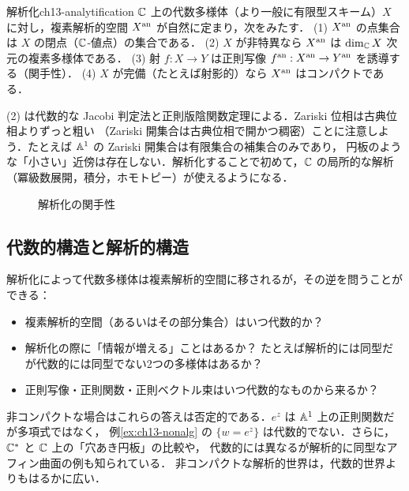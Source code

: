 \begin{myprop}{解析化}{ch13-analytification}
$\mathbb{C}$ 上の代数多様体（より一般に有限型スキーム）$X$ に対し，複素解析的空間 $X^{\rm an}$ が自然に定まり，次をみたす．
(1) $X^{\rm an}$ の点集合は $X$ の閉点（$\mathbb{C}$-値点）の集合である．
(2) $X$ が非特異なら $X^{\rm an}$ は $\dim_{\mathbb{C}} X$ 次元の複素多様体である．
(3) 射 $f:X\to Y$ は正則写像 $f^{\rm an}:X^{\rm an}\to Y^{\rm an}$ を誘導する（関手性）．
(4) $X$ が完備（たとえば射影的）なら $X^{\rm an}$ はコンパクトである．
\end{myprop}

(2) は代数的な Jacobi 判定法と正則版陰関数定理による．Zariski 位相は古典位相よりずっと粗い
（Zariski 開集合は古典位相で開かつ稠密）ことに注意しよう．たとえば $\mathbb{A}^1$ の Zariski 開集合は有限集合の補集合のみであり，
円板のような「小さい」近傍は存在しない．解析化することで初めて，$\mathbb{C}$ の局所的な解析（冪級数展開，積分，ホモトピー）が使えるようになる．

\begin{figure}[ht]
\centering
{}
\caption{解析化の関手性}
\end{figure}

\subsection{代数的構造と解析的構造}

解析化によって代数多様体は複素解析的空間に移されるが，その逆を問うことができる：
\begin{itemize}
  \item 複素解析的空間（あるいはその部分集合）はいつ代数的か？
  \item 解析化の際に「情報が増える」ことはあるか？ たとえば解析的には同型だが代数的には同型でない2つの多様体はあるか？
  \item 正則写像・正則関数・正則ベクトル束はいつ代数的なものから来るか？
\end{itemize}
非コンパクトな場合はこれらの答えは否定的である．$e^z$ は $\mathbb{A}^1$ 上の正則関数だが多項式ではなく，
例\ref{ex:ch13-nonalg} の $\{w=e^z\}$ は代数的でない．さらに，$\mathbb{C}^*$ と $\mathbb{C}$ 上の「穴あき円板」の比較や，
代数的には異なるが解析的に同型なアフィン曲面の例も知られている．
非コンパクトな解析的世界は，代数的世界よりもはるかに広い．

